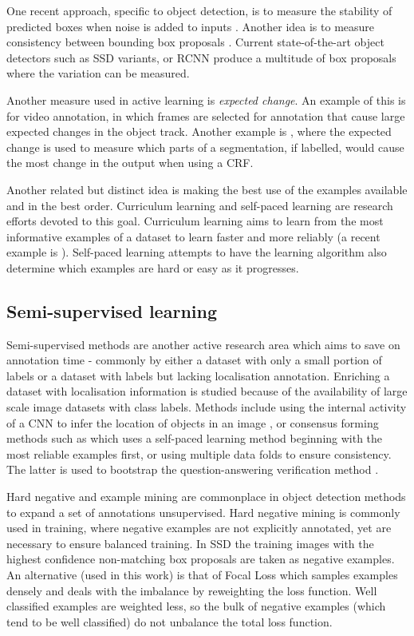  One recent approach, specific to object detection, is to measure the stability of predicted boxes when noise is added to inputs \cite{Kao2018}. Another idea is to measure consistency between bounding box proposals \cite{Kao2018, Brust2018, Le2018}. Current state-of-the-art object detectors such as \gls{SSD}  \cite{Liu2016a} variants, or \gls{RCNN} \cite{Wang2017} produce a multitude of box proposals where the variation can be measured.

Another measure used in active learning is \emph{expected change}. An example of this is \cite{Vondrick2011} for video annotation, in which frames are selected for annotation that cause large expected changes in the object track. Another example is \cite{Xu2017}, where the expected change is used to measure which parts of a segmentation, if labelled, would cause the most change in the output when using a \gls{CRF}.

Another related but distinct idea is making the best use of the examples available and in the best order. Curriculum learning and self-paced learning \cite{Kumar2010} are research efforts devoted to this goal. Curriculum learning aims to learn from the most informative examples of a dataset to learn faster and more reliably (a recent example is \cite{Katharopoulos2018}). Self-paced learning attempts to have the learning algorithm also determine which examples are hard or easy as it progresses.


\subsection{Semi-supervised learning}

Semi-supervised methods are another active research area which aims to save on annotation time - commonly by either a dataset with only a small portion of labels or a dataset with labels but lacking localisation annotation. Enriching a dataset with localisation information is studied because of the availability of large scale image datasets with class labels. Methods include using the internal activity of a \gls{CNN} to infer the location of objects in an image \cite{Sivic2015}, or consensus forming methods such as \cite{Sangineto} which uses a self-paced learning method beginning with the most reliable examples first, or \cite{Cinbis2017} using multiple data folds to ensure consistency. The latter is used to bootstrap the question-answering verification method \cite{Papadopoulos2016}.

Hard negative and example mining are commonplace in object detection methods to expand a set of annotations unsupervised. Hard negative mining is commonly used in training, where negative examples are not explicitly annotated, yet are necessary to ensure balanced training. In \gls{SSD} \cite{Liu2016a} the training images with the highest confidence non-matching  box proposals are taken as negative examples. An alternative (used in this work) is that of Focal Loss \cite{Lin2017} which samples examples densely and deals with the imbalance by reweighting the loss function. Well classified examples are weighted less, so the bulk of negative examples (which tend to be well classified) do not unbalance the total loss function.

